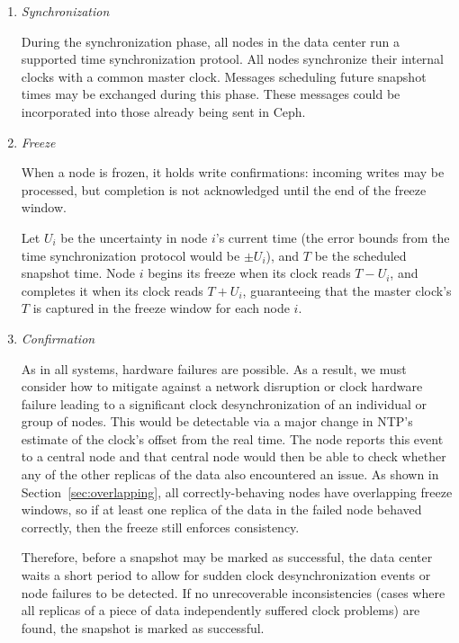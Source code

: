\begin{enumerate}

\item \emph{Synchronization}

  During the synchronization phase, all nodes in the data center run a
  supported time synchronization protool. All nodes synchronize
  their internal clocks with a common master
  clock\footnotemark. Messages scheduling future snapshot times may be
  exchanged during this phase. These messages could be incorporated
  into those already being sent in Ceph.


\item \emph{Freeze}
 
 When a node is frozen, it holds write confirmations: incoming writes
 may be processed, but completion is not acknowledged until the end
 of the freeze window.
 
 Let $U_i$ be the uncertainty in node $i$'s current time (the error
 bounds from the time synchronization protocol would be $\pm U_i$), and
 $T$ be the scheduled snapshot time. Node $i$ begins its freeze when
 its clock reads $T - U_i$, and completes it when its clock reads
 $T + U_i$, guaranteeing that the master clock's $T$ is captured in
 the freeze window for each node $i$.

\item \emph{Confirmation}

  As in all systems, hardware failures are possible. As a result, we
  must consider how to mitigate against a network disruption or clock
  hardware failure leading to a significant clock desynchronization of
  an individual or group of nodes. This would be detectable via a
  major change in NTP's estimate of the clock's offset from the real
  time. The node reports this event to a central node and that central
  node would then be able to check whether any of the other replicas
  of the data also encountered an issue. As shown in
  Section~\ref{sec:overlapping}, all correctly-behaving nodes have
  overlapping freeze windows, so if at least one replica of the data
  in the failed node behaved correctly, then the freeze still enforces
  consistency.
 
  Therefore, before a snapshot may be marked as successful, the data
  center waits a short period to allow for sudden clock
  desynchronization events or node failures to be detected. If no
  unrecoverable inconsistencies (cases where all replicas of a piece
  of data independently suffered clock problems) are found, the
  snapshot is marked as successful.


\end{enumerate}
